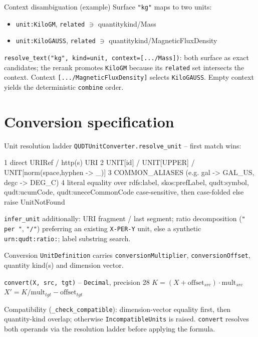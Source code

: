 \documentclass[aspectratio=169]{beamer}
\newcommand{\code}[1]{\texttt{\small #1}}
\begin{document}
\begin{frame}{Context disambiguation (example)}
  Surface \code{"kg"} maps to two units:
  \begin{itemize}
    \item \code{unit:KiloGM}, \code{related} $\ni$ quantitykind/Mass
    \item \code{unit:KiloGAUSS}, \code{related} $\ni$
          quantitykind/MagneticFluxDensity
  \end{itemize}
  \code{resolve\_text("kg", kind=unit, context=[.../Mass])}: both surface
  as exact candidates; the rerank promotes \code{KiloGM} because its
  \code{related} set intersects the context. Context
  \code{[.../MagneticFluxDensity]} selects \code{KiloGAUSS}. Empty context
  yields the deterministic \code{combine} order.
\end{frame}

\section{Conversion specification}

\begin{frame}[fragile]{Unit resolution ladder}
  \code{QUDTUnitConverter.resolve\_unit} -- first match wins:
  \begin{semiverbatim}\scriptsize
1  direct URIRef / http(s) URI
2  UNIT[id] / UNIT[UPPER] / UNIT[norm(space,hyphen -> _)]
3  COMMON_ALIASES   (e.g. gal -> GAL_US, degc -> DEG_C)
4  literal equality over
     {rdfs:label, skos:prefLabel, qudt:symbol,
      qudt:ucumCode, qudt:uneceCommonCode}
     case-sensitive, then case-folded
   else raise UnitNotFound
  \end{semiverbatim}
  \code{infer\_unit} additionally: URI fragment / last segment; ratio
  decomposition (\code{" per "}, \code{"/"}) preferring an existing
  \code{X-PER-Y} unit, else a synthetic \code{urn:qudt:ratio:};
  label substring search.
\end{frame}

\begin{frame}[fragile]{Conversion}
  \code{UnitDefinition} carries \code{conversionMultiplier},
  \code{conversionOffset}, quantity kind(s) and dimension vector.
  \begin{block}{\code{convert(X, src, tgt)} -- \code{Decimal}, precision 28}
    \centering
    $K = (X + \text{offset}_{src})\cdot \text{mult}_{src}$
    \hspace{2em}
    $X' = K / \text{mult}_{tgt} - \text{offset}_{tgt}$
  \end{block}
  Compatibility (\code{\_check\_compatible}): dimension-vector equality
  first, then quantity-kind overlap; otherwise
  \code{IncompatibleUnits} is raised. \code{convert} resolves both
  operands via the resolution ladder before applying the formula.
\end{frame}
\end{document}
